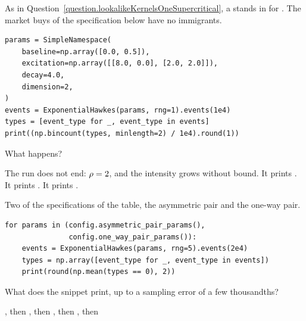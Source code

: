 \begin{question}
\label{question.buysWithNeitherImmigrantsNorExciters}
As in Question~\ref{question.lookalikeKernelsOneSupercritical},
a  stands in for .
The market buys of the specification below have no immigrants.
\begin{lstlisting}[caption={A specification with a branching ratio of 2}, label=listing.buysWithNeitherImmigrantsNorExciters]
params = SimpleNamespace(
    baseline=np.array([0.0, 0.5]),
    excitation=np.array([[8.0, 0.0], [2.0, 2.0]]),
    decay=4.0,
    dimension=2,
)
events = ExponentialHawkes(params, rng=1).events(1e4)
types = [event_type for _, event_type in events]
print((np.bincount(types, minlength=2) / 1e4).round(1))
\end{lstlisting}
What happens?
\begin{choices}
 \choice The run does not end: $\rho = 2$, and the intensity grows without bound.
 \choice It prints \codehl{[0. 0.5]}.
 \choice It prints \codehl{[0. 0.8]}.
 \correctchoice It prints \codehl{[0. 1.]}.
\end{choices}
\end{question}

\begin{question}
\label{question.balanceOfBuysAndSellsAgainstImmigrants}
Two of the specifications of the table, the asymmetric pair and the one-way pair.
\begin{lstlisting}[caption={The share of the buys on a long path of each}, label=listing.balanceOfBuysAndSellsAgainstImmigrants]
for params in (config.asymmetric_pair_params(),
               config.one_way_pair_params()):
    events = ExponentialHawkes(params, rng=5).events(2e4)
    types = np.array([event_type for _, event_type in events])
    print(round(np.mean(types == 0), 2))
\end{lstlisting}
What does the snippet print, up to a sampling error of a few thousandths?
\begin{choices}
 \choice {}, then 
 \correctchoice {}, then 
 \choice {}, then 
 \choice {}, then 
\end{choices}
\end{question}

